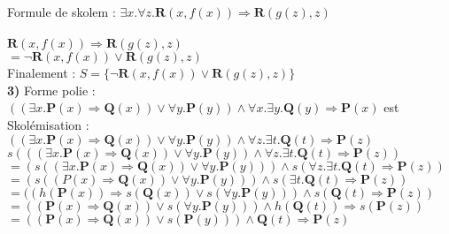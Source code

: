 \documentclass{article}
\begin{document}
Formule de skolem : $\exists x.\forall z.\textbf{R}(x,f(x)) \Rightarrow \textbf{R}(g(z),z)$\\

\\
$\textbf{R}(x,f(x)) \Rightarrow \textbf{R}(g(z),z)$\\

$= \neg \textbf{R}(x,f(x))\lor \textbf{R}(g(z),z)$\\

Finalement : $S = \{\neg \textbf{R}(x,f(x))\lor \textbf{R}(g(z),z)\}$\\



\textbf{3)} Forme polie : $((\exists x.\textbf{P}(x) \Rightarrow \textbf{Q}(x)) \lor \forall y.\textbf{P}(y)) \land \forall x.\exists y.\textbf{Q}(y) \Rightarrow \textbf{P}(x)$ est\\

Skolémisation : \\

$((\exists x.\textbf{P}(x) \Rightarrow \textbf{Q}(x)) \lor \forall y.\textbf{P}(y)) \land \forall z.\exists t.\textbf{Q}(t) \Rightarrow \textbf{P}(z)$\\

$s(((\exists x.\textbf{P}(x) \Rightarrow \textbf{Q}(x)) \lor \forall y.\textbf{P}(y)) \land \forall z.\exists t.\textbf{Q}(t) \Rightarrow \textbf{P}(z))$\\

$= (s((\exists x.\textbf{P}(x) \Rightarrow \textbf{Q}(x)) \lor \forall y.\textbf{P}(y))) \land s(\forall z.\exists t.\textbf{Q}(t) \Rightarrow \textbf{P}(z))$\\

$= (s((P(x) \Rightarrow \textbf{Q}(x)) \lor \forall y.\textbf{P}(y))) \land s(\exists t.\textbf{Q}(t) \Rightarrow \textbf{P}(z))$\\

$= ((h(\textbf{P}(x)) \Rightarrow s(\textbf{Q}(x)) \lor s(\forall y.\textbf{P}(y))) \land s(\textbf{Q}(t) \Rightarrow \textbf{P}(z))$\\

$= ((\textbf{P}(x) \Rightarrow \textbf{Q}(x)) \lor s(\forall y.\textbf{P}(y))) \land h(\textbf{Q}(t)) \Rightarrow s(\textbf{P}(z))$\\

$= ((\textbf{P}(x) \Rightarrow \textbf{Q}(x)) \lor s(\textbf{P}(y))) \land \textbf{Q}(t) \Rightarrow \textbf{P}(z)$\\
\end{document}
